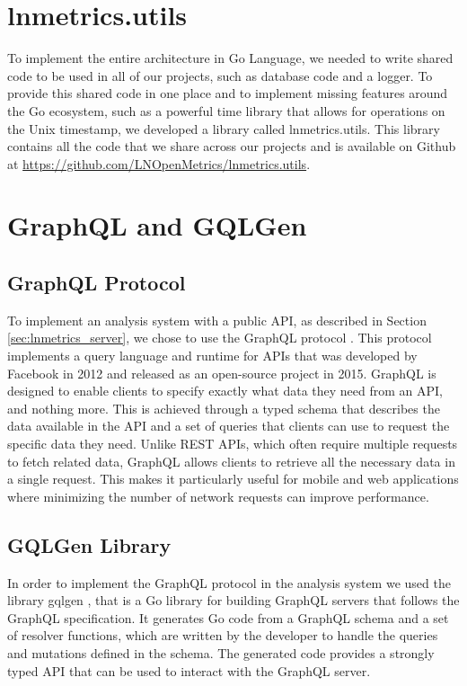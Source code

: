 \section{lnmetrics.utils}

To implement the entire architecture in Go Language, we needed to write shared 
code to be used in all of our projects, such as database code and a logger. 
To provide this shared code in one place and to implement missing features 
around the Go ecosystem, such as a powerful time library that allows for 
operations on the Unix timestamp, we developed a library called lnmetrics.utils. 
This library contains all the code that we share across our projects and is 
available on Github at \url{https://github.com/LNOpenMetrics/lnmetrics.utils}.

\section{GraphQL and GQLGen}

\subsection{GraphQL Protocol}

To implement an analysis system with a public API, as  described in 
Section \ref{sec:lnmetrics_server}, we chose to use the GraphQL protocol \cite{graphql}. 
This protocol implements a query language and runtime for APIs that was 
developed by Facebook in 2012 and released as an open-source project in 2015. 
GraphQL is designed to enable clients to specify exactly what data they need 
from an API, and nothing more. This is achieved through a typed schema that 
describes the data available in the API and a set of queries that clients can 
use to request the specific data they need. Unlike REST APIs, which often require 
multiple requests to fetch related data, GraphQL allows clients to retrieve all 
the necessary data in a single request. This makes it particularly useful for 
mobile and web applications where minimizing the number of network 
requests can improve performance.

\subsection{GQLGen Library}

In order to implement the GraphQL protocol \cite{graphql} in the analysis system we used the library
gqlgen \cite{gqlgen}, that is a Go library for building GraphQL servers that follows the GraphQL specification. 
It generates Go code from a GraphQL schema and a set of resolver functions, which are written 
by the developer to handle the queries and mutations defined in the schema. The generated code 
provides a strongly typed API that can be used to interact with the GraphQL server.

